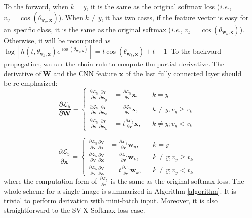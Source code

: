 \documentclass[10pt,twocolumn,letterpaper]{article}
\begin{document}
To the forward, when $k=y$, it is the same as the original softmax loss (\textit{i.e.}, $v_y=\cos(\theta_{\bm{w}_y,\bm{x}})$). When $k\neq y$, it has two cases, if the feature vector is easy for an specific class, it is the same as the original softmax (\textit{i.e.},  $v_k=\cos(\theta_{\bm{w}_k,\bm{x}})$). Otherwise, it will be recomputed as $\log[h(t,\theta_{\bm{w}_k,\bm{x}})e^{\cos(\theta_{\bm{w}_k,\bm{x}})}]=t\cos(\theta_{\bm{w}_k,\bm{x}})+t-1$. To the backward propagation, we use the chain rule to compute the partial derivative. The derivative of $\bm{W}$ and the CNN feature $\bm{x}$ of the last fully connected layer should be re-emphasized:
\begin{equation} \label{UpdateW}
\frac{\partial{\mathcal{L}_5}}{\partial{\bm{W}}} =
\left\{
\begin{aligned}
\frac{\partial{\mathcal{L}_5}}{\partial{\bm{v}}}\frac{\partial{\bm{v}}}{\partial{\bm{w}_y}} &= \frac{\partial{\mathcal{L}_5}}{\partial{\bm{v}}}\bm{x}, && k = y \\
\frac{\partial{\mathcal{L}_5}}{\partial{\bm{v}}}\frac{\partial{\bm{v}}}{\partial{\bm{w}_k}} &= \frac{\partial{\mathcal{L}_5}}{\partial{\bm{v}}}\bm{x}, &&k \neq y; v_y \geq v_k \\
\frac{\partial{\mathcal{L}_5}}{\partial{\bm{v}}}\frac{\partial{\bm{v}}}{\partial{\bm{w}_k}} &=t \frac{\partial{\mathcal{L}_5}}{\partial{\bm{v}}}\bm{x}, && k \neq y; v_y < v_k
\end{aligned}
\right.
\end{equation}

\begin{equation} \label{Updatex}
\frac{\partial{\mathcal{L}_5}}{\partial{\bm{x}}} =
\left\{
\begin{aligned}
\frac{\partial{\mathcal{L}_5}}{\partial{\bm{v}}}\frac{\partial{\bm{v}}}{\partial{\bm{x}}} &= \frac{\partial{\mathcal{L}_5}}{\partial{\bm{v}}}\bm{w}_y, && k=y \\
\frac{\partial{\mathcal{L}_5}}{\partial{\bm{v}}}\frac{\partial{\bm{v}}}{\partial{\bm{x}}} &= \frac{\partial{\mathcal{L}_5}}{\partial{\bm{v}}}\bm{w}_k, && k\neq y;  v_y \geq v_k \\
\frac{\partial{\mathcal{L}_5}}{\partial{\bm{v}}}\frac{\partial{\bm{v}}}{\partial{\bm{x}}} &=t \frac{\partial{\mathcal{L}_5}}{\partial{\bm{v}}}\bm{w}_k, && k\neq y; v_y < v_k
\end{aligned}
\right.
\end{equation}
where the computation form of $\frac{\partial{\mathcal{L}_5}}{\partial{\bm{v}}}$ is the same as the original softmax loss.
The whole scheme for a single image is summarized in Algorithm \ref{algorithm}. It is trivial to perform derivation with mini-batch input. Moreover, it is also straightforward to the SV-X-Softmax loss case.
\end{document}
